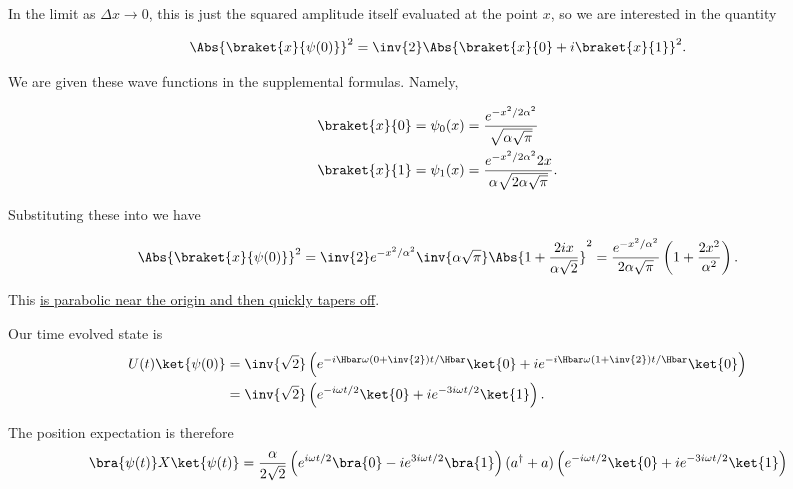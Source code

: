 {In the limit as \(\Delta x \rightarrow 0\), this is just the squared amplitude itself evaluated at the point \(x\), so we are interested in the quantity

\begin{equation}\label{eqn:qmIexamPractice2008Dec:3:210}
\Abs{ \braket{x}{\psi(0)} }^2  = \inv{2} \Abs{ \braket{x}{0} + i \braket{x}{1} }^2.
\end{equation}

We are given these wave functions in the supplemental formulas.  Namely,

\begin{equation}\label{eqn:qmIexamPractice2008Dec:3:220}
\begin{aligned}
\braket{x}{0} &= \psi_0(x) = \frac{e^{-x^2/2\alpha^2}}{ \sqrt{\alpha \sqrt{\pi}}} \\
\braket{x}{1} &= \psi_1(x) = \frac{e^{-x^2/2\alpha^2} 2 x }{ \alpha \sqrt{2 \alpha \sqrt{\pi}}}.
\end{aligned}
\end{equation}

Substituting these into  we have

\begin{equation}\label{eqn:qmIexamPractice2008Dec:3:230}
\Abs{ \braket{x}{\psi(0)} }^2
=
\inv{2}
e^{-x^2/\alpha^2}
\inv{
\alpha \sqrt{\pi}}
\Abs{ 1 + \frac{2 i x}{\alpha \sqrt{2} } }^2
=
\frac{e^{-x^2/\alpha^2}}{ 2
\alpha \sqrt{\pi}}
\left( 1 + \frac{2 x^2}{\alpha^2 } \right).
\end{equation}

This \href{http://www.wolframalpha.com/input/?i=graph+e^(-x^2)+(1+\%2B+2x^2)}{is parabolic near the origin and then quickly tapers off}.

Our time evolved state is
\begin{equation}\label{eqn:qmIexamPractice2008Dec:3:300}
\begin{aligned}
U(t) \ket{\psi(0)} 
&= \inv{\sqrt{2}}
\left(
e^{-i \Hbar \omega \left( 0 + \inv{2} \right) t/\Hbar } \ket{0}
+ i e^{-i \Hbar \omega \left( 1 + \inv{2} \right) t/\Hbar } \ket{0}
\right) \\
&=
\inv{\sqrt{2}}
\left(
e^{-i \omega t/2 } \ket{0}
+ i e^{- 3 i \omega t/2 } \ket{1}
\right).
\end{aligned}
\end{equation}

The position expectation is therefore
\begin{equation}\label{eqn:qmIexamPractice:750}
\begin{aligned}
\bra{\psi(t)} X \ket{\psi(t)}
&=
\frac{\alpha}{2 \sqrt{2}}
\left(
e^{i \omega t/2 } \bra{0}
- i e^{ 3 i \omega t/2 } \bra{1}
\right)
(a^\dagger + a)
\left(
e^{-i \omega t/2 } \ket{0}
+ i e^{- 3 i \omega t/2 } \ket{1}
\right) \\
\end{aligned}
\end{equation}

}
